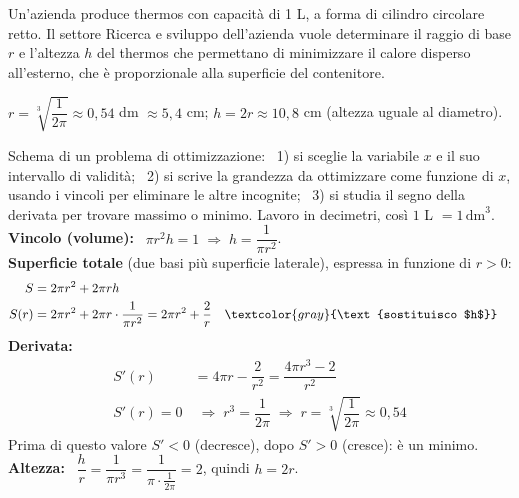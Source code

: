 \begin{question}[ID=1.1, subtitle={Thermos cilindrico di minima superficie a volume fissato}, tags={ottimizzazione, geometria, solidi}, difficulty=media]
Un'azienda produce thermos con capacità di 1 L, a forma di cilindro circolare retto. Il settore Ricerca e sviluppo dell'azienda vuole determinare il raggio di base $r$ e l'altezza $h$ del thermos che permettano di minimizzare il calore disperso all'esterno, che è proporzionale alla superficie del contenitore.
\begin{solution}
$r=\sqrt[3]{\dfrac{1}{2\pi}}\approx0{,}54$ dm $\approx5{,}4$ cm; \quad $h=2r\approx10{,}8$ cm (altezza uguale al diametro).
\end{solution}
\begin{explanation}
Schema di un problema di ottimizzazione: \ 1) si sceglie la variabile $x$ e il suo intervallo di validità; \ 2) si scrive la grandezza da ottimizzare come funzione di $x$, usando i vincoli per eliminare le altre incognite; \ 3) si studia il segno della derivata per trovare massimo o minimo.
Lavoro in decimetri, così $1$ L $=1\,\text{dm}^3$. \\
\textbf{Vincolo (volume):} \ $\pi r^2h=1 \;\Rightarrow\; h=\dfrac{1}{\pi r^2}$. \\
\textbf{Superficie totale} (due basi più superficie laterale), espressa in funzione di $r>0$:
\[\begin{aligned}
S &= 2\pi r^2+2\pi rh\\
S(r) &= 2\pi r^2+2\pi r\cdot\dfrac{1}{\pi r^2}=2\pi r^2+\dfrac2r && \textcolor{gray}{\text{sostituisco $h$}}
\end{aligned}\]
\textbf{Derivata:}
\[\begin{aligned}
S'(r) &= 4\pi r-\dfrac{2}{r^2}=\dfrac{4\pi r^3-2}{r^2}\\
S'(r)=0 &\;\Rightarrow\; r^3=\dfrac{1}{2\pi} \;\Rightarrow\; r=\sqrt[3]{\dfrac1{2\pi}}\approx0{,}54
\end{aligned}\]
Prima di questo valore $S'<0$ (decresce), dopo $S'>0$ (cresce): è un minimo. \\
\textbf{Altezza:} \ $\dfrac hr=\dfrac{1}{\pi r^3}=\dfrac{1}{\pi\cdot\frac1{2\pi}}=2$, quindi $h=2r$.
\end{explanation}
\end{question}



